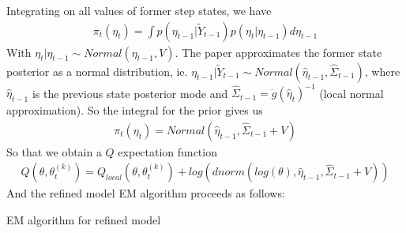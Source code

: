 \documentclass[twoside]{article}
\begin{document}
Integrating on all values of former step states, we have
\begin{align*}
\pi_t(\eta_t) = \int p(\eta_{t - 1} | \tilde{Y}_{t - 1}) p(\eta_t | \eta_{t - 1}) d\eta_{t -1 }
\end{align*}
With $\eta_t | \eta_{t - 1} \sim Normal(\eta_{t - 1}, V)$. The paper approximates the former state posterior as a normal distribution, ie. $\eta_{t - 1} | \tilde{Y}_{t - 1} \sim Normal(\hat{\eta}_{t - 1}, \hat{\Sigma}_{t -1 })$, where $\hat{\eta}_{t - 1}$ is the previous state posterior mode and $\hat{\Sigma}_{t -1 } = \ddot{g}(\hat{\eta}_t)^{-1}$ (local normal approximation). So the integral for the prior gives us
\begin{align*}
\pi_t(\eta_t) = Normal(\hat{\eta}_{t - 1}, \hat{\Sigma}_{t - 1} + V)
\end{align*}
So that we obtain a $Q$ expectation function
\begin{eqnarray}
Q(\theta, \theta_t^{(k)}) = Q_{local}(\theta, \theta_t^{(k)}) + log\left(dnorm\left(log(\theta), \hat{\eta}_{t - 1}, \hat{\Sigma}_{t - 1} + V\right)\right) 
\end{eqnarray}
And the refined model EM algorithm proceeds as follows:\\

\vspace{.2 in}
\begin{algorithm}[H]
 \caption{EM algorithm for refined model}
\end{algorithm}
\vspace{.2 in}

\end{document}
